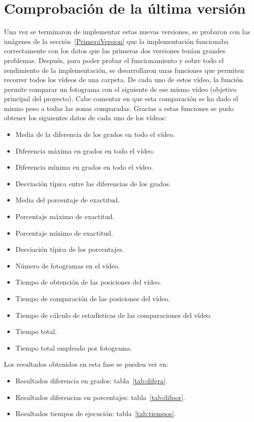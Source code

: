 {\section{Comprobación de la última versión}
Una vez se terminaron de implementar estas nuevas versiones, se probaron con las imágenes de la sección~\ref{PrimeraVersion} que la implementación funcionaba correctamente con los datos que las primeras dos versiones tenían grandes problemas. Después, para poder probar el funcionamiento y sobre todo el rendimiento de la implementación, se desarrollaron unas funciones que permiten recorrer todos los vídeos de una carpeta. De cada uno de estos vídeo, la función permite comparar un fotograma con el siguiente de ese mismo vídeo (objetivo principal del proyecto). Cabe comentar en que esta comparación se ha dado el mismo peso a todas las zonas comparadas. Gracias a estas funciones se pudo obtener los siguientes datos de cada uno de los vídeos:
\begin{itemize}
	\item Media de la diferencia de los grados en todo el vídeo.
	\item Diferencia máxima en grados en todo el vídeo.
	\item Diferencia mínima en grados en todo el vídeo.
	\item Desviación típica entre las diferencias de los grados.
	\item Media del porcentaje de exactitud.
	\item Porcentaje máximo de exactitud.
	\item Porcentaje mínimo de exactitud.
	\item Desviación típica de los porcentajes.
	\item Número de fotogramas en el vídeo.
	\item Tiempo de obtención de las posiciones del vídeo.
	\item Tiempo de comparación de las posiciones del vídeo.
	\item Tiempo de cálculo de estadísticas de las comparaciones del vídeo.
	\item Tiempo total.
	\item Tiempo total empleado por fotograma.
\end{itemize}

Los resultados obtenidos en esta fase se pueden ver en:
\begin{itemize}
	\item Resultados diferencia en grados: tabla~\ref{tab:difgra}.
	\item Resultados diferencias en porcentajes: tabla~\ref{tab:difpor}.
	\item Resultados tiempos de ejecución: tabla~\ref{tab:tiempos}.
\end{itemize}

}

